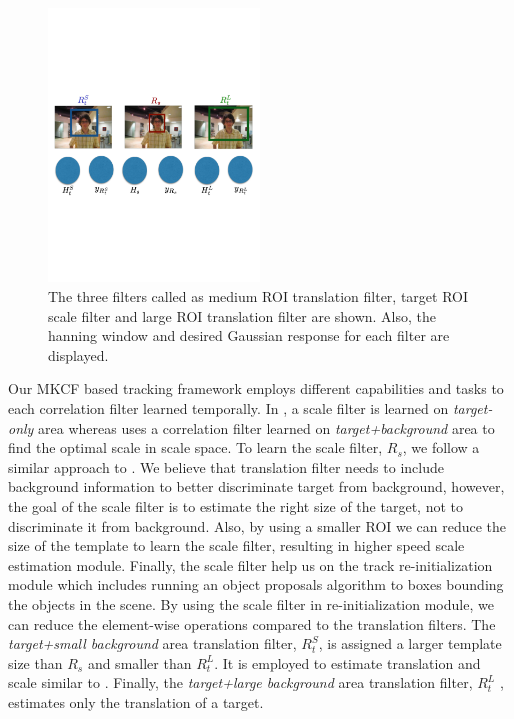 \documentclass[10pt,twocolumn,letterpaper]{article}
\newcounter{ct}
\begin{document}
\begin{figure}[!t]
\includegraphics[width=0.5\textwidth]{figures/Filters_Details.pdf}
\caption{The three filters called as medium ROI translation filter, target ROI scale filter and large ROI translation filter are shown. Also, the hanning window and desired Gaussian response for each filter are displayed.}
\label{fig:Filters}
\end{figure}

Our MKCF based tracking framework employs different capabilities and tasks to each correlation filter learned temporally. In \cite{ma2015long, danelljan2014accurate}, a scale filter is learned on \textit{target-only} area whereas \cite{henriques2015high, li2014scale, bibi2015multi, tang2015multi} uses a correlation filter learned on \textit{target+background} area to find the optimal scale in scale space. To learn the scale filter, $R_{s}$, we follow a similar approach to \cite{ma2015long}. We believe that translation filter needs to include background information to better discriminate target from background, however, the goal of the scale filter is to estimate the right size of the target, not to discriminate it from background. Also, by using a smaller ROI we can reduce the size of the template to learn the scale filter, resulting in higher speed scale estimation module. Finally, the scale filter help us on the track re-initialization module which includes running an object proposals algorithm to boxes bounding the objects in the scene. By using the scale filter in re-initialization module, we can reduce the element-wise operations compared to the translation filters. The \textit{target+small background} area translation filter, $R_{t}^{S}$, is assigned a larger template size than $R_{s}$ and smaller than $R_{t}^{L}$. It is employed to estimate translation and scale similar to \cite{henriques2015high}. Finally, the \textit{target+large background} area translation filter, $R_{t}^{L}$ , estimates only the translation of a target.
\end{document}
